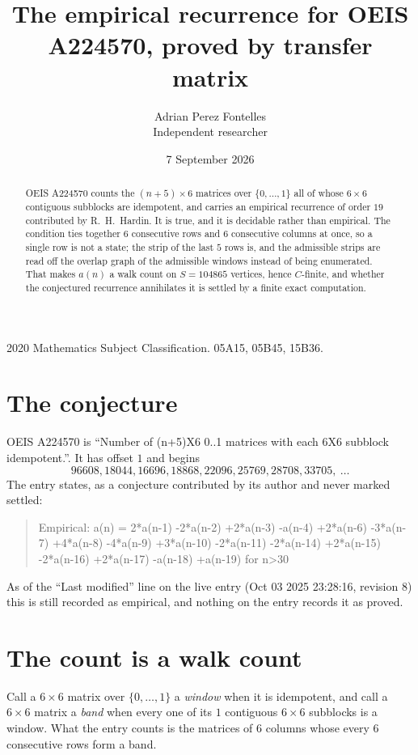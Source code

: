 \documentclass[11pt,a4paper]{article}
\title{The empirical recurrence for OEIS A224570, proved by transfer matrix}
\author{Adrian Perez Fontelles\\ \small Independent researcher}
\date{7 September 2026}
\theoremstyle{plain}
\theoremstyle{definition}
\begin{document}
\maketitle

\begin{abstract}
OEIS A224570 counts the $(n+5)\times6$ matrices over $\{0,\dots,1\}$ all of whose
$6\times6$ contiguous subblocks are idempotent, and carries an empirical recurrence of order
$19$ contributed by R.~H.~Hardin. It is true, and it is decidable rather than empirical.
The condition ties together $6$ consecutive rows and $6$ consecutive columns at once, so a
single row is not a state; the strip of the last $5$ rows is, and the admissible strips
are read off the overlap graph of the admissible windows instead of being enumerated. That
makes $a(n)$ a walk count on $S=104865$ vertices, hence $C$-finite, and whether the conjectured
recurrence annihilates it is settled by a finite exact computation.
\end{abstract}

\noindent\small 2020 Mathematics Subject Classification. 05A15, 05B45, 15B36.\normalsize

\section{The conjecture}

OEIS A224570 is ``Number of (n+5)X6 0..1 matrices with each 6X6 subblock idempotent.''. It has offset $1$ and begins
\[
96608, 18044, 16696, 18868, 22096, 25769, 28708, 33705,\ \dots
\]
The entry states, as a conjecture contributed by its author and never marked settled:
\begin{quote}
Empirical: a(n) = 2*a(n-1) -2*a(n-2) +2*a(n-3) -a(n-4) +2*a(n-6) -3*a(n-7) +4*a(n-8) -4*a(n-9) +3*a(n-10) -2*a(n-11) -2*a(n-14) +2*a(n-15) -2*a(n-16) +2*a(n-17) -a(n-18) +a(n-19) for n>30
\end{quote}
As of the ``Last modified'' line on the live entry (Oct 03 2025 23:28:16, revision 8) this is still
recorded as empirical, and nothing on the entry records it as proved.

\section{The count is a walk count}

Call a $6\times6$ matrix over $\{0,\dots,1\}$ a \emph{window} when it is idempotent, and
call a $6\times6$ matrix a \emph{band} when every one of its $1$ contiguous
$6\times6$ subblocks is a window. What the entry counts is the matrices of $6$ columns
whose every $6$ consecutive rows form a band.
\end{document}
